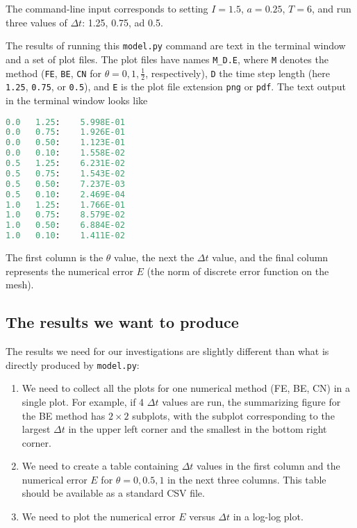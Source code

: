 \documentclass[graybox,sectrefs,envcountresetchap,open=right,final]{svmonodo}
\begin{document}
The command-line input corresponds to setting $I=1.5$, $a=0.25$, $T=6$,
and run three values of $\Delta t$: 1.25, 0.75, ad 0.5.

The results of running this \texttt{model.py} command are text in the
terminal window and a set of plot files.
The plot files have names \Verb!M_D.E!, where \texttt{M} denotes the method
(\texttt{FE}, \texttt{BE}, \texttt{CN} for $\theta=0,1,\frac{1}{2}$, respectively), \texttt{D}
the time step length (here \texttt{1.25}, \texttt{0.75}, or \texttt{0.5}), and \texttt{E}
is the plot file extension \texttt{png} or \texttt{pdf}.
The text output in the terminal window looks like














\begin{lstlisting}[language=Python,style=gray]
0.0   1.25:    5.998E-01
0.0   0.75:    1.926E-01
0.0   0.50:    1.123E-01
0.0   0.10:    1.558E-02
0.5   1.25:    6.231E-02
0.5   0.75:    1.543E-02
0.5   0.50:    7.237E-03
0.5   0.10:    2.469E-04
1.0   1.25:    1.766E-01
1.0   0.75:    8.579E-02
1.0   0.50:    6.884E-02
1.0   0.10:    1.411E-02

\end{lstlisting}

The first column is the $\theta$ value, the next the $\Delta t$ value,
and the final column represents the numerical error $E$ (the
norm of discrete error function on the mesh).

\subsection{The results we want to produce}

The results we need for our investigations are slightly different than
what is directly produced by \texttt{model.py}:

\begin{enumerate}
\item We need to collect all the plots for one numerical method (FE, BE, CN) in a single plot. For example, if 4 $\Delta t$ values are run, the summarizing figure for the BE method has $2\times 2$ subplots, with the subplot corresponding to the largest $\Delta t$ in the upper left corner and the smallest in the bottom right corner.

\item We need to create a table containing $\Delta t$ values in the first column and the numerical error $E$ for $\theta=0,0.5,1$ in the next three columns. This table should be available as a standard CSV file.

\item We need to plot the numerical error $E$ versus $\Delta t$ in a log-log plot.
\end{enumerate}
\end{document}
